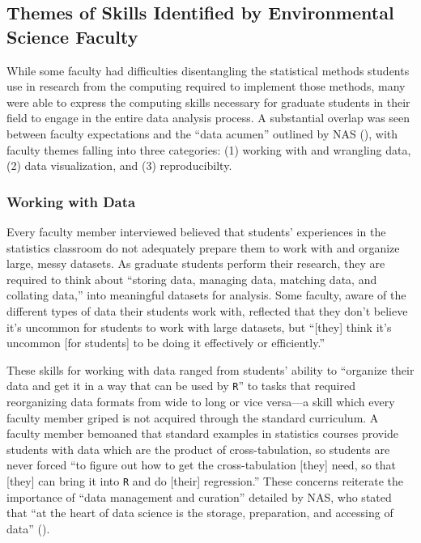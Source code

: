 \documentclass[12pt]{article}
\begin{document}
\subsection{Themes of Skills Identified by Environmental Science Faculty}

\noindent While some faculty had difficulties disentangling the statistical methods
students use in research from the computing required to implement those methods,
many were able to express the computing skills necessary for graduate students
in their field to engage in the entire data analysis process. A substantial
overlap was seen between faculty expectations and the ``data acumen'' outlined
by NAS (\citeyear{nas}), with faculty themes falling into three categories: (1)
working with and wrangling data, (2) data visualization, and (3) reproducibilty. 

\subsubsection{Working with Data}  

\noindent Every faculty member interviewed believed that students' experiences in
the statistics classroom do not adequately prepare them to work with and
organize large, messy datasets. As graduate students perform their research,
they are required to think about ``storing data, managing data, matching
data, and collating data,'' into meaningful datasets for analysis. Some 
faculty, aware of the different types of data their students work with, 
reflected that they don't believe it's uncommon for students to work with 
large datasets, but ``[they] think it's uncommon [for students] to be doing it
effectively or efficiently.'' 

\quad These skills for working with data ranged from students' ability to 
``organize their data and get it in a way that can be used by \texttt{R}'' to 
tasks that required reorganizing data formats from wide to long or vice 
versa---a skill which every faculty member griped is not acquired through the
standard curriculum. A faculty member bemoaned that standard examples in
statistics courses provide students with data which are the product
of cross-tabulation, so students are never forced ``to figure out how to get the
cross-tabulation [they] need, so that [they] can bring it into \texttt{R} and do
[their] regression.'' These concerns reiterate the importance of ``data
management and curation'' detailed by NAS, who stated that ``at the heart of
data science is the storage, preparation, and accessing of data'' 
(\citeyear[p.\ 26]{nas}). 
\end{document}
